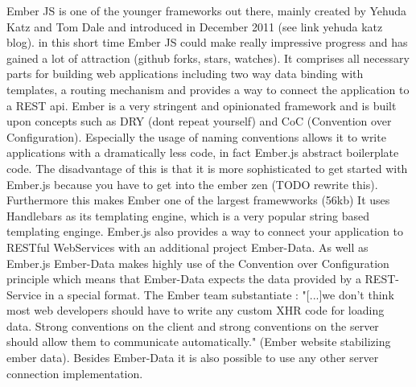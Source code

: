 Ember JS is one of the younger frameworks out there, mainly created by Yehuda Katz and Tom Dale and introduced in December 2011 (see link yehuda katz blog). in this short time Ember JS could make really impressive progress and has gained a lot of attraction (github forks, stars, watches). It comprises all necessary parts for building web applications including two way data binding with templates, a routing mechanism and provides a way to connect the application to a REST api.
Ember is a very stringent and opinionated framework and is built upon concepts such as DRY (dont repeat yourself) and CoC (Convention over Configuration). Especially the usage of naming conventions allows it to write applications with a dramatically less code, in fact Ember.js abstract boilerplate code. The disadvantage of this is that it is more sophisticated to get started with Ember.js because you have to get into the ember zen (TODO rewrite this). Furthermore this makes Ember one of the largest framewworks (56kb)
It uses Handlebars as its templating engine, which is a very popular string based templating enginge. Ember.js also provides a way to connect your application to RESTful WebServices with an additional project Ember-Data. As well as Ember.js Ember-Data makes highly use of the Convention over Configuration principle which means that Ember-Data expects the data provided by a REST-Service in a special format. The Ember team substantiate : "[...]we don't think most web developers should have to write any custom XHR code for loading data. Strong conventions on the client and strong conventions on the server should allow them to communicate automatically." (Ember website stabilizing ember data). Besides Ember-Data it is also possible to use any other server connection implementation.         



